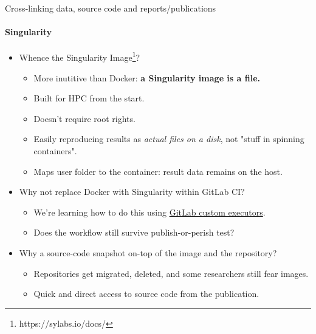 \documentclass[
	aspectratio=169,%
	color={accentcolor=2d},
	logo=true,%
	colorframetitle=true,%
	]{tudabeamer}
\begin{document}
\begin{frame}{Cross-linking data, source code and reports/publications} 
    \framesubtitle{Singularity} 
        
    \vfill
    \begin{itemize}
        \item Whence the Singularity Image\footnote{https://sylabs.io/docs/}?
            \begin{itemize}
                \item More inutitive than Docker: \textbf{a Singularity image is a file.} 
                \item Built for HPC from the start. 
                \item Doesn't require root rights. 
                \item Easily reproducing results as \emph{actual files on a disk}, not "stuff in spinning containers". 
                \item Maps user folder to the container: result data remains on the host. 
            \end{itemize}
        \item Why not replace Docker with Singularity within GitLab CI? 
            \begin{itemize}
                \item We're learning how to do this using \href{https://docs.gitlab.com/runner/executors/custom.html}{GitLab custom executors}.
                \item Does the workflow still survive publish-or-perish \faGraduationCap test?
            \end{itemize}
        \item Why a source-code snapshot on-top of the image and the repository? 
            \begin{itemize}
                \item Repositories get migrated, deleted, and some researchers still fear images. 
                \item Quick and direct access to source code from the publication. 
            \end{itemize}
    \end{itemize}

\end{frame}
\end{document}
